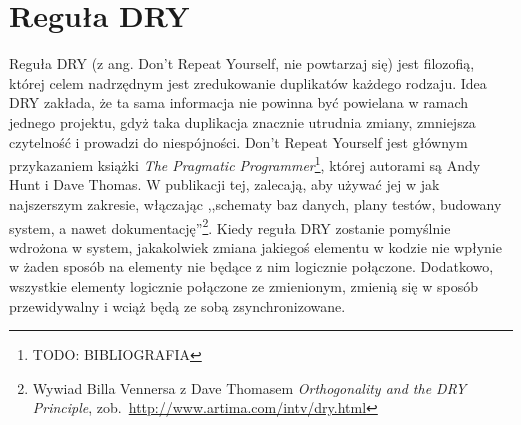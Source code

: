 \documentclass[a4paper,12pt,oneside]{report}
\begin{document}
\section{Reguła DRY}
\label{sec:dry}
Reguła DRY (z ang. Don't Repeat Yourself, nie powtarzaj się) jest filozofią, której celem nadrzędnym jest zredukowanie duplikatów każdego rodzaju. Idea DRY zakłada, że ta sama informacja nie powinna być powielana w ramach jednego projektu, gdyż taka duplikacja znacznie utrudnia zmiany, zmniejsza czytelność i prowadzi do niespójności. Don't Repeat Yourself jest głównym przykazaniem książki \emph{The Pragmatic Programmer}\footnote{TODO: BIBLIOGRAFIA}, której autorami są Andy Hunt i Dave Thomas. W publikacji tej, zalecają, aby używać jej w jak najszerszym zakresie, włączając ,,schematy baz danych, plany testów, budowany system, a nawet dokumentację''\footnote{Wywiad Billa Vennersa z Dave Thomasem \emph{Orthogonality and the DRY Principle}, zob.~\url{http://www.artima.com/intv/dry.html}}. Kiedy reguła DRY zostanie pomyślnie wdrożona w system, jakakolwiek zmiana jakiegoś elementu w kodzie nie wpłynie w żaden sposób na elementy nie będące z nim logicznie połączone. Dodatkowo, wszystkie elementy logicznie połączone ze zmienionym, zmienią się w sposób przewidywalny i wciąż będą ze sobą zsynchronizowane.
\end{document}
